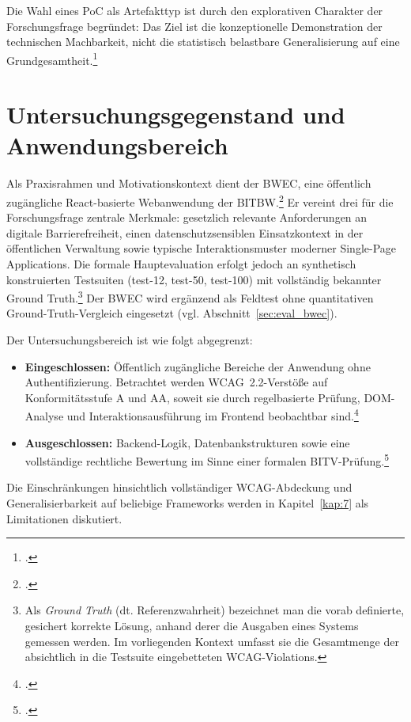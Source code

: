 Die Wahl eines \ac{PoC} als Artefakttyp ist durch den explorativen Charakter der Forschungsfrage begründet: Das Ziel ist die konzeptionelle Demonstration der technischen Machbarkeit, nicht die statistisch belastbare Generalisierung auf eine Grundgesamtheit.\footcite[Vgl.][]{hevner2004dsr}

\section{Untersuchungsgegenstand und Anwendungsbereich} \label{sec:scope}

Als Praxisrahmen und Motivationskontext dient der \ac{BWEC}, eine öffentlich zugängliche React-basierte Webanwendung der \ac{BITBW}.\footcite[Vgl.][]{bwec} Er vereint drei für die Forschungsfrage zentrale Merkmale: gesetzlich relevante Anforderungen an digitale Barrierefreiheit, einen datenschutzsensiblen Einsatzkontext in der öffentlichen Verwaltung sowie typische Interaktionsmuster moderner Single-Page Applications. Die formale Hauptevaluation erfolgt jedoch an synthetisch konstruierten Testsuiten (test-12, test-50, test-100) mit vollständig bekannter Ground Truth.\footnote{Als \textit{Ground Truth} (dt. Referenzwahrheit) bezeichnet man die vorab definierte, gesichert korrekte Lösung, anhand derer die Ausgaben eines Systems gemessen werden. Im vorliegenden Kontext umfasst sie die Gesamtmenge der absichtlich in die Testsuite eingebetteten \ac{WCAG}-Violations.} Der \ac{BWEC} wird ergänzend als Feldtest ohne quantitativen Ground-Truth-Vergleich eingesetzt (vgl. Abschnitt~\ref{sec:eval_bwec}).

Der Untersuchungsbereich ist wie folgt abgegrenzt:

\begin{itemize}
    \item \textbf{Eingeschlossen:} Öffentlich zugängliche Bereiche der Anwendung ohne Authentifizierung. Betrachtet werden \ac{WCAG}~2.2-Verstöße auf Konformitätsstufe A und AA, soweit sie durch regelbasierte Prüfung, \ac{DOM}-Analyse und Interaktionsausführung im Frontend beobachtbar sind.\footcite[Vgl.][]{WCAG}
    \item \textbf{Ausgeschlossen:} Backend-Logik, Datenbankstrukturen sowie eine vollständige rechtliche Bewertung im Sinne einer formalen \ac{BITV}-Prüfung.\footcite[Vgl.][]{BITV}
\end{itemize}

Die Einschränkungen hinsichtlich vollständiger \ac{WCAG}-Abdeckung und Generalisierbarkeit auf beliebige Frameworks werden in Kapitel~\ref{kap:7} als Limitationen diskutiert.

